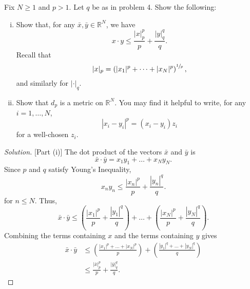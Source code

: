 \documentclass[11pt,letterpaper]{article}
\newcommand{\R}{\mathbb{R}}
\newenvironment{prob}[1]
  {\renewcommand\theinnerprob{#1}\innerprob}
  {\endinnerprob}
\newenvironment{solution}
  {\renewcommand\qedsymbol{}\begin{proof}[Solution]}
  {\end{proof}\bigskip}
\begin{document}
\begin{prob}{5}  %
Fix $N\geq 1$ and $p>1$.  Let $q$ be as in problem 4. Show the following:
\begin{enumerate}[(i)]

	\item Show that, for any $\bar x, \bar y \in \R^N$, we have
		\[
			x\cdot y \leq \frac{|x|_p^p}{p} + \frac{|y|_q^q}{q}.
		\]
		Recall that
		\[
			|x|_p = \left(|x_1|^p + \cdots + |x_N|^p\right)^{\sfrac1p},
		\]
		and similarly for $|\cdot|_q$.  
	
	\item Show that $d_p$ is a metric on $\R^N$.  You may find it helpful to write, for any $i=1,\dots, N$,
		\[
			|x_i - y_i|^p = (x_i - y_i) z_i
		\]
		for a well-chosen $z_i$.
	
\end{enumerate}
\end{prob}
\begin{solution}[Part (i)]
	 The dot product of the vectors $\bar x$ and $\bar y$ is $$\bar x \cdot \bar y = x_1y_1 + \dotsc + x_Ny_N.$$ Since $p$ and $q$ satisfy Young's Inequality, $$x_ny_n \leq \frac{|x_n|^p}{p} + \frac{|y_n|^q}{q}.$$ for $n\leq N$. Thus, $$\bar x \cdot \bar y \leq \left ( \frac{|x_1|^p}{p} + \frac{|y_1|^q}{q} \right ) + \dotsc + \left( \frac{|x_N|^p}{p} + \frac{|y_N|^q}{q}\right ).$$ Combining the terms containing $x$ and the terms containing $y$ gives 
	 \[\begin{split}
	 \bar x \cdot \bar y &\leq \left ( \frac{|x_1|^p+ \dotsc + |x_N|^p}{p} \right ) + \left( \frac{|y_1|^q+\dotsc+|y_N|^q}{q}\right )\\
	 &\leq \frac{|\bar x|_p^p}{p} + \frac{|\bar y|_q^q}{q}.
	 \end{split}\]
	 
\end{solution}
\end{document}
